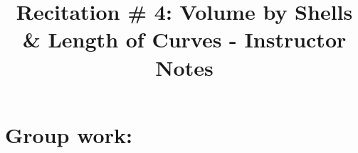 \documentclass[handout,instructornotes]{ximera}
\title{Recitation \# 4: Volume by Shells \& Length of Curves - Instructor Notes}
\begin{document}
\begin{abstract}		\end{abstract}
\maketitle

\section{Group work:}
\end{document}

